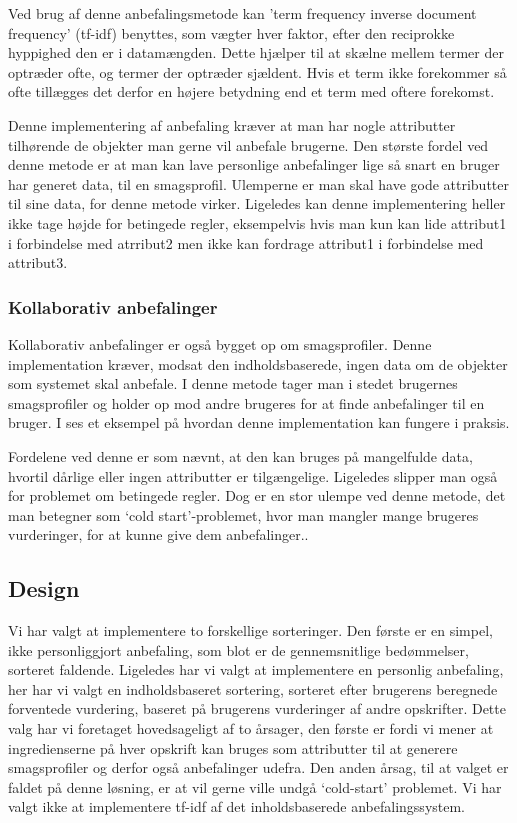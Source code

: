 Ved brug af denne anbefalingsmetode kan 'term frequency inverse document frequency' (tf-idf) benyttes, som vægter hver faktor, efter den reciprokke hyppighed den er i datamængden.
Dette hjælper til at skælne mellem termer der optræder ofte, og termer der optræder sjældent.
Hvis et term ikke forekommer så ofte tillægges det derfor en højere betydning end et term med oftere forekomst.

Denne implementering af anbefaling kræver at man har nogle attributter tilhørende de objekter man gerne vil anbefale brugerne.
Den største fordel ved denne metode  er at man kan lave personlige anbefalinger lige så snart en bruger har generet data, til en smagsprofil.
Ulemperne er man skal have gode attributter til sine data, for denne metode virker. 
Ligeledes kan denne implementering heller ikke tage højde for betingede regler, eksempelvis hvis man kun kan lide attribut1 i forbindelse med atrribut2 men ikke kan fordrage attribut1 i forbindelse med attribut3.

\subsubsection{Kollaborativ anbefalinger}
Kollaborativ anbefalinger er også bygget op om smagsprofiler.
Denne implementation kræver, modsat den indholdsbaserede, ingen data om de objekter som systemet skal anbefale. 
I denne metode tager man i stedet brugernes smagsprofiler og holder op mod andre brugeres for at finde anbefalinger til en bruger.
I  ses et eksempel på hvordan denne implementation kan fungere i praksis.

Fordelene ved denne er som nævnt, at den kan bruges på mangelfulde data, hvortil dårlige eller ingen attributter er tilgængelige.
Ligeledes slipper man også for problemet om betingede regler.
Dog er en stor ulempe ved denne metode, det man betegner som ‘cold start’-problemet, hvor man mangler mange brugeres vurderinger, for at kunne give dem anbefalinger.\citep{RecommenderSystems}.


\subsection{Design}
Vi har valgt at implementere to forskellige sorteringer.
Den første er en simpel, ikke personliggjort anbefaling, som blot er de gennemsnitlige bedømmelser, sorteret faldende.
Ligeledes har vi valgt at implementere en personlig anbefaling, her har vi valgt en indholdsbaseret sortering, sorteret efter brugerens beregnede forventede vurdering, baseret på brugerens vurderinger af andre opskrifter.
Dette valg har vi foretaget hovedsageligt af to årsager, den første er fordi vi mener at ingredienserne på hver opskrift kan bruges som attributter til at generere smagsprofiler og derfor også anbefalinger udefra.
Den anden årsag, til at valget er faldet på denne løsning, er at vil gerne ville undgå ‘cold-start’ problemet.
Vi har valgt ikke at implementere tf-idf af det inholdsbaserede anbefalingssystem.

